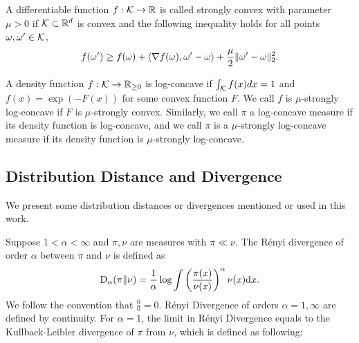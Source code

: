 
\begin{definition}
A differentiable function $f:\mathcal K\rightarrow \mathbb{R}$ is called strongly convex with parameter $\mu>0$ if ${\cal K}\subset \mathbb{R}^{d}$ is convex and the following inequality holds for all points $\omega,\omega'\in {\cal K}$,
\[
f(\omega')\geq f(\omega) +\left\langle \nabla f(\omega),\omega'-\omega \right\rangle+\frac{\mu}{2}\|\omega'-\omega\|_2^2.
\]
\end{definition}

\begin{definition}
A density function $f:\mathcal K \rightarrow \mathbb{R}_{\geq 0}$ is log-concave if $\int_{\mathcal K} f(x) dx = 1$ and $f(x) = \exp(-F(x))$ for some convex function $F$. We call $f$ is $\mu$-strongly log-concave if $F$ is $\mu$-strongly convex. Similarly, we call $\pi$ a log-concave measure if its density function is log-concave, and we call $\pi$ is a $\mu$-strongly log-concave measure if its density function is $\mu$-strongly log-concave.
\end{definition}


\subsection{Distribution Distance and Divergence}
We present some distribution distances or divergences mentioned or used in this work.
\label{sec:dis_measure}
\begin{definition}{\cite[R{\'e}nyi Divergence]{Ren61}}
Suppose $1<\alpha<\infty$ and $\pi,\nu$ are measures with $\pi\ll\nu$.
The R{\'e}nyi divergence of order $\alpha$ between $\pi$ and $\nu$ is defined as
\begin{align*}
    \mathrm{D}_{\alpha}(\pi\|\nu)=\frac{1}{\alpha}\log\int\left(\frac{\pi(x)}{\nu(x)}\right)^{\alpha}\nu(x)\mathrm{d} x.
\end{align*}
We follow the convention that $\frac{0}{0}=0$. R{\'e}nyi Divergence of orders $\alpha=1,\infty$ are defined by continuity.
For $\alpha=1$, the limit in R{\'e}nyi Divergence equals to the Kullback-Leibler divergence of $\pi$ from $\nu$, which is defined as following:
\end{definition}

